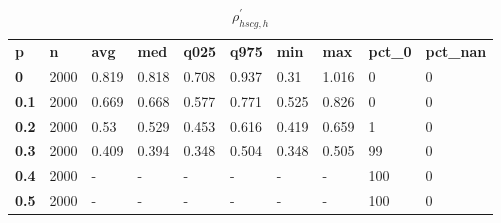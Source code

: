 \begin{table}[h]
 \centering 
\footnotesize
\caption{$\rho_{hscg,h}^\prime $}
\label{tab:alphahscgh}
\begin{tabular}[h]{| l l l l l l l l l l|
    } \hline
\textbf{ p} & \textbf{ n} & \textbf{ avg} & \textbf{ med} & \textbf{ q025} & \textbf{ q975} & \textbf{ min} & \textbf{ max} & \textbf{ pct\_0} & \textbf{ pct\_nan}
           \\
  \textbf{  0} & 2000 & 0.819 & 0.818 & 0.708 & 0.937 &  0.31 & 1.016 &   0 & 0
           \\
  \textbf{0.1} & 2000 & 0.669 & 0.668 & 0.577 & 0.771 & 0.525 & 0.826 &   0 & 0
           \\
  \textbf{0.2} & 2000 &  0.53 & 0.529 & 0.453 & 0.616 & 0.419 & 0.659 &   1 & 0
           \\
  \textbf{0.3} & 2000 & 0.409 & 0.394 & 0.348 & 0.504 & 0.348 & 0.505 &  99 & 0
           \\
  \textbf{0.4} & 2000 & - & - & - & - & - & - & 100 & 0
           \\
  \textbf{0.5} & 2000 & - & - & - & - & - & - & 100 & 0
           \\
 \hline \end{tabular}
 \end{table}
